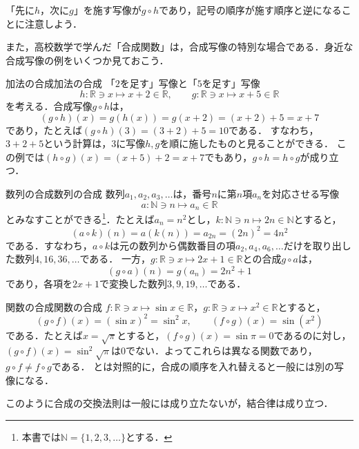 「先に$h$，次に$g$」を施す写像が$g \circ h$であり，記号の順序が施す順序と逆になることに注意しよう．

 
また，高校数学で学んだ「合成関数」は，合成写像の特別な場合である．身近な合成写像の例をいくつか見ておこう．
 
\begin{example}{加法の合成}{加法の合成}
  「$2$を足す」写像と「$5$を足す」写像
  \[
    h \colon \mathbb{R} \ni x \mapsto x + 2 \in \mathbb{R}, \qquad
    g \colon \mathbb{R} \ni x \mapsto x + 5 \in \mathbb{R}
  \]
  を考える．合成写像$g \circ h$は，
  \[
    (g \circ h)(x) = g(h(x)) = g(x + 2) = (x + 2) + 5 = x + 7
  \]
  であり，たとえば$(g \circ h)(3) = (3 + 2) + 5 = 10$である．
  すなわち，$3 + 2 + 5$という計算は，$3$に写像$h,g$を順に施したものと見ることができる．
  この例では$(h \circ g)(x) = (x + 5) + 2 = x + 7$でもあり，$g \circ h = h \circ g$が成り立つ．
\end{example}
 
\begin{example}{数列の合成}{数列の合成}
  数列$a_1, a_2, a_3, \ldots$は，番号$n$に第$n$項$a_n$を対応させる写像
  \[
    a \colon \mathbb{N} \ni n \mapsto a_n \in \mathbb{R}
  \]
  とみなすことができる\footnote{本書では$\mathbb{N} = \{1, 2, 3, \ldots\}$とする．}．たとえば$a_n = n^2$とし，$k \colon \mathbb{N} \ni n \mapsto 2n \in \mathbb{N}$とすると，
  \[
    (a \circ k)(n) = a(k(n)) = a_{2n} = (2n)^2 = 4n^2
  \]
  である．すなわち，$a \circ k$は元の数列から偶数番目の項$a_2, a_4, a_6, \ldots$だけを取り出した数列$4, 16, 36, \ldots$である．
  一方，$g \colon \mathbb{R} \ni x \mapsto 2x + 1 \in \mathbb{R}$との合成$g \circ a$は，
  \[
    (g \circ a)(n) = g(a_n) = 2n^2 + 1
  \]
  であり，各項を$2x + 1$で変換した数列$3, 9, 19, \ldots$である．
\end{example}
 
\begin{example}{関数の合成}{関数の合成}
  $f \colon \mathbb{R} \ni x \mapsto \sin x \in \mathbb{R}$，$g \colon \mathbb{R} \ni x \mapsto x^2 \in \mathbb{R}$とすると，
  \[
    (g \circ f)(x) = (\sin x)^2 = \sin^2 x, \qquad
    (f \circ g)(x) = \sin(x^2)
  \]
  である．たとえば$x = \sqrt{\pi}$とすると，$(f \circ g)(x) = \sin \pi = 0$であるのに対し，$(g \circ f)(x) = \sin^2 \sqrt{\pi}$は$0$でない．よってこれらは異なる関数であり，$g \circ f \ne f \circ g$である．
  とは対照的に，合成の順序を入れ替えると一般には別の写像になる．
\end{example}

このように合成の交換法則は一般には成り立たないが，結合律は成り立つ．

